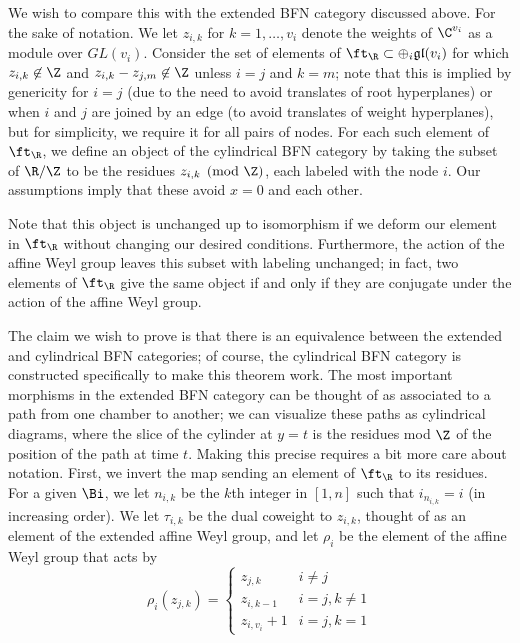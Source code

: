 We wish to compare this with the extended BFN category discussed above.  For the sake of notation.  We let $z_{i,k}$ for $k=1,\dots, v_i$ denote the weights of $\C^{v_i}$ as a module over
$GL(v_i)$.  Consider the set of elements of $\ft_{\R}\subset \oplus_i \mathfrak{gl}(v_i)$ for which $z_{i,k}\not\in \Z $ and  $z_{i,k}-z_{j,m}\not\in \Z$ unless $i=j$ and $k=m$; note that this is implied by genericity for $i=j$ (due to the need to avoid translates of root hyperplanes) or when $i$ and $j$ are joined by an edge (to avoid translates of weight hyperplanes), but for simplicity, we require it for all pairs of nodes.
For each such element of $\ft_{\R}$, we define an object of the cylindrical BFN category by taking the subset of $\R/\Z$ to be the residues $z_{i,k}\pmod \Z$, each labeled with the node $i$.  Our assumptions imply that these avoid $x=0$ and each other.  

Note that this object is unchanged up to isomorphism if we deform our element in $\ft_{\R}$ without changing our desired conditions.  Furthermore, the action of the affine Weyl group leaves this subset with labeling unchanged; in fact, two elements of $\ft_{\R}$ give the same object if and only if they are conjugate under the action of the affine Weyl group.  

The claim we wish to prove is that there is an equivalence between the extended and cylindrical BFN categories; of course, the cylindrical BFN category is constructed specifically to make this theorem work.  The most important morphisms in the extended BFN category can be thought of as associated to a path from one chamber to another; we can visualize these paths as cylindrical diagrams, where the slice of the cylinder at $y=t$ is the residues mod $\Z$ of the position of the path at time $t$. 
Making this precise requires a bit more care about notation.
First, we invert the map sending an element of $\ft_{\R}$ to its residues.  For a given $\Bi$, 
we let $n_{i,k}$ be the $k$th integer in $[1,n]$ such that
$i_{n_{i,k}}=i$ (in increasing order).    We let $\tau_{i,k}$ be the dual coweight to $z_{i,k}$, thought of as an
element of the extended affine Weyl group, and let $\rho_i$ be the element of the  affine Weyl group that acts by 
\begin{equation*}
    \rho_i(z_{j,k})=\begin{cases}
    z_{j,k} & i\neq j\\
    z_{i,k-1} & i=j, k\neq 1\\
    z_{i,v_i}+1 & i=j,k=1
    \end{cases}
\end{equation*}

